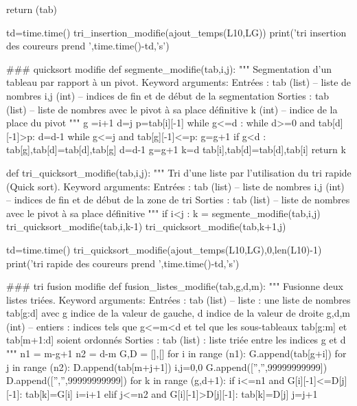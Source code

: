 \begin{corrige}
\begin{python}
    return (tab)
    
td=time.time()
tri_insertion_modifie(ajout_temps(L10,LG))
print('tri insertion des coureurs prend ',time.time()-td,'s')
 

### quicksort modifie
def segmente_modifie(tab,i,j):
    """
    Segmentation d'un tableau par rapport à un pivot.
    Keyword arguments: 
    Entrées :
        tab (list) -- liste de nombres
        i,j (int) -- indices de fin et de début de la segmentation
    Sorties :    
        tab (list) -- liste de nombres avec le pivot à sa place définitive
        k (int) -- indice de la place du pivot
    """
    g =i+1
    d=j
    p=tab[i][-1]
    while g<=d :
        while d>=0 and tab[d][-1]>p:
            d=d-1
        while g<=j and tab[g][-1]<=p:
            g=g+1
        if g<d :
            tab[g],tab[d]=tab[d],tab[g]
            d=d-1
            g=g+1
    k=d
    tab[i],tab[d]=tab[d],tab[i]
    return k
    
def tri_quicksort_modifie(tab,i,j):
    """
    Tri d'une liste par l'utilisation du tri rapide (Quick sort).
    Keyword arguments:
    Entrées :
        tab (list) -- liste de nombres
        i,j (int) -- indices de fin et de début de la zone de tri
    Sorties :    
        tab (list) -- liste de nombres avec le pivot à sa place définitive
    """
    if i<j :
        k = segmente_modifie(tab,i,j)
        tri_quicksort_modifie(tab,i,k-1)
        tri_quicksort_modifie(tab,k+1,j)
        
td=time.time()
tri_quicksort_modifie(ajout_temps(L10,LG),0,len(L10)-1)
print('tri rapide des coureurs prend ',time.time()-td,'s')

### tri fusion modifie
def fusion_listes_modifie(tab,g,d,m):
    """
    Fusionne deux listes triées.
    Keyword arguments:
    Entrées :
        tab (list) -- liste : une liste de nombres tab[g:d] avec g indice de la 
            valeur de gauche, d indice de la valeur de droite
        g,d,m (int) -- entiers : indices tels que g<=m<d et tel que les 
            sous-tableaux tab[g:m] et tab[m+1:d] soient ordonnés
    Sorties :
        tab (list) : liste triée entre les indices g et d
    """
    n1 = m-g+1
    n2 = d-m
    G,D = [],[]
    for i in range (n1):
        G.append(tab[g+i])
    for j in range (n2):
        D.append(tab[m+j+1])
    i,j=0,0
    G.append(['','',99999999999])
    D.append(['','',99999999999])
    for k in range (g,d+1):
        if i<=n1 and  G[i][-1]<=D[j][-1]:
            tab[k]=G[i]
            i=i+1
        elif j<=n2 and G[i][-1]>D[j][-1]:
            tab[k]=D[j]
            j=j+1
            

\end{python}
\end{corrige}
